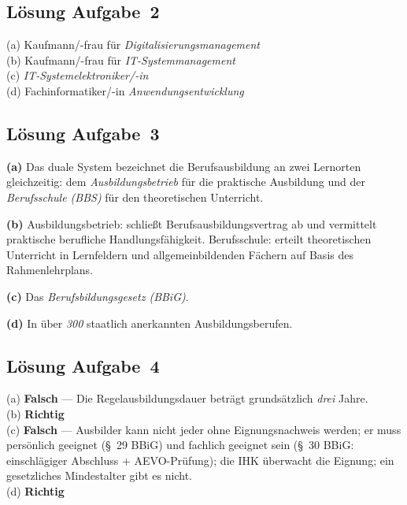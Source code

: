 \documentclass[11pt, a4paper]{article}
\begin{document}
\subsection*{Lösung Aufgabe~2}
\begin{loesung}
(a) Kaufmann/-frau für \emph{Digitalisierungsmanagement}\\
(b) Kaufmann/-frau für \emph{IT-Systemmanagement}\\
(c) \emph{IT-Systemelektroniker/-in}\\
(d) Fachinformatiker/-in \emph{Anwendungsentwicklung}
\end{loesung}

\subsection*{Lösung Aufgabe~3}
\begin{loesung}
\textbf{(a)} Das duale System bezeichnet die Berufsausbildung an zwei Lernorten
gleichzeitig: dem \emph{Ausbildungsbetrieb} für die praktische Ausbildung und der
\emph{Berufsschule (BBS)} für den theoretischen Unterricht.

\textbf{(b)} Ausbildungsbetrieb: schließt Berufsausbildungsvertrag ab und vermittelt
praktische berufliche Handlungsfähigkeit. Berufsschule: erteilt theoretischen Unterricht
in Lernfeldern und allgemeinbildenden Fächern auf Basis des Rahmenlehrplans.

\textbf{(c)} Das \emph{Berufsbildungsgesetz (BBiG)}.

\textbf{(d)} In über \emph{300} staatlich anerkannten Ausbildungsberufen.
\end{loesung}

\subsection*{Lösung Aufgabe~4}
\begin{loesung}
(a) \textbf{Falsch} --- Die Regelausbildungsdauer beträgt grundsätzlich \emph{drei} Jahre.\\
(b) \textbf{Richtig}\\
(c) \textbf{Falsch} --- Ausbilder kann nicht jeder ohne Eignungsnachweis werden; er muss persönlich geeignet (§~29 BBiG) und fachlich geeignet sein (§~30 BBiG: einschlägiger Abschluss + AEVO-Prüfung); die IHK überwacht die Eignung; ein gesetzliches Mindestalter gibt es nicht.\\
(d) \textbf{Richtig}
\end{loesung}
\end{document}
